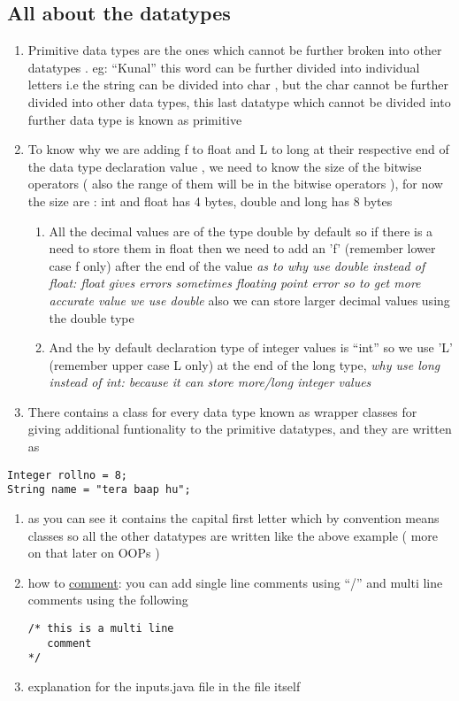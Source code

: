 \documentclass[11pt]{article}
\begin{document}
\subsection{All about the datatypes}
\label{sec:org4d1114b}
\begin{enumerate}
\item Primitive data types are the ones which cannot be further broken into other datatypes . eg: ``Kunal'' this word can be further divided into individual letters i.e the string can be divided into char , but the char cannot be further divided into other data types, this last datatype which cannot be divided into further data type is known as primitive
\item To know why we are adding f to float and L to long at their respective end of the data type declaration value , we need to know the size of the bitwise operators ( also the range of them will be in the bitwise operators ),
for now the size are : int and float has 4 bytes, double and long has 8 bytes
\begin{enumerate}
\item All the decimal values are of the type double by default so if there is a need to store them in float then we need to add an 'f' (remember lower case f only) after the end of the value
\emph{as to why use double instead of float: float gives errors sometimes floating point error so to get more accurate value we use double}
also we can  store larger decimal values using the double type
\item And the by default declaration type of integer values is ``int'' so we use 'L' (remember upper case L only) at the end of the long type,
\emph{why use long instead of int: because it can store more/long integer values}
\end{enumerate}
\item There contains a class for every data type known as wrapper classes for giving additional funtionality to the primitive datatypes, and they are written as
\end{enumerate}
\begin{verbatim}
Integer rollno = 8;
String name = "tera baap hu";
\end{verbatim}
\begin{enumerate}
\item as you can see it contains the capital first letter which by convention means classes so all the other datatypes are written like the above example ( more on that later on OOPs )

\item how to \uline{comment}:  you can add single line comments using ``/'' and multi line comments using the following
\begin{verbatim}
/* this is a multi line
   comment
*/
\end{verbatim}

\item explanation for the inputs.java file in the file itself
\end{enumerate}
\end{document}
